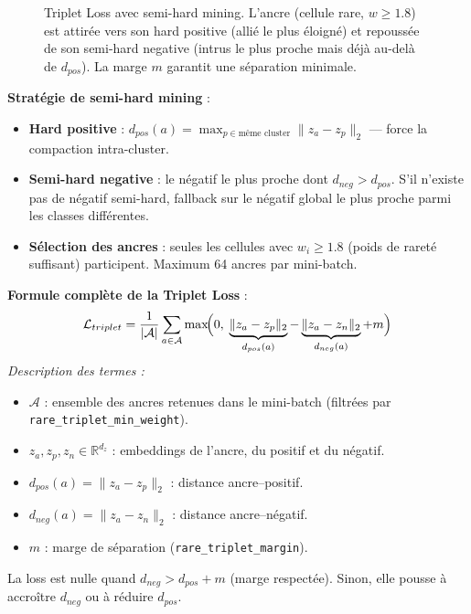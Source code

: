 \documentclass[11pt,a4paper]{article}
\begin{document}
\begin{figure}[H]
{%
}
\caption{Triplet Loss avec semi-hard mining. L'ancre (cellule rare, $w \geq 1.8$) est attir\'ee vers son hard positive (alli\'e le plus \'eloign\'e) et repouss\'ee de son semi-hard negative (intrus le plus proche mais d\'ej\`a au-del\`a de $d_{pos}$). La marge $m$ garantit une s\'eparation minimale.}
\label{fig:triplet}
\end{figure}

\textbf{Strat\'egie de semi-hard mining} :
\begin{itemize}[nosep]
  \item \textbf{Hard positive} : $d_{pos}(a) = \max_{p \in \text{m\^eme cluster}} \|z_a - z_p\|_2$ --- force la compaction intra-cluster.
  \item \textbf{Semi-hard negative} : le n\'egatif le plus proche dont $d_{neg} > d_{pos}$. S'il n'existe pas de n\'egatif semi-hard, fallback sur le n\'egatif global le plus proche parmi les classes diff\'erentes.
  \item \textbf{S\'election des ancres} : seules les cellules avec $w_i \geq 1.8$ (poids de raret\'e suffisant) participent. Maximum 64 ancres par mini-batch.
\end{itemize}

\textbf{Formule compl\`ete de la Triplet Loss} :
\[
  \mathcal{L}_{triplet} = \frac{1}{|\mathcal{A}|} \sum_{a \in \mathcal{A}} \max\!\Bigl(0,\; \underbrace{\|z_a - z_p\|_2}_{d_{pos}(a)} - \underbrace{\|z_a - z_n\|_2}_{d_{neg}(a)} + m\Bigr)
\]
\textit{Description des termes :}
\begin{itemize}[nosep]
  \item $\mathcal{A}$ : ensemble des ancres retenues dans le mini-batch (filtr\'ees par \texttt{rare\_triplet\_min\_weight}).
  \item $z_a, z_p, z_n \in \mathbb{R}^{d_z}$ : embeddings de l'ancre, du positif et du n\'egatif.
  \item $d_{pos}(a)=\|z_a-z_p\|_2$ : distance ancre--positif.
  \item $d_{neg}(a)=\|z_a-z_n\|_2$ : distance ancre--n\'egatif.
  \item $m$ : marge de s\'eparation (\texttt{rare\_triplet\_margin}).
\end{itemize}
La loss est nulle quand $d_{neg} > d_{pos} + m$ (marge respect\'ee). Sinon, elle pousse \`a accro\^itre $d_{neg}$ ou \`a r\'eduire $d_{pos}$.
\end{document}
